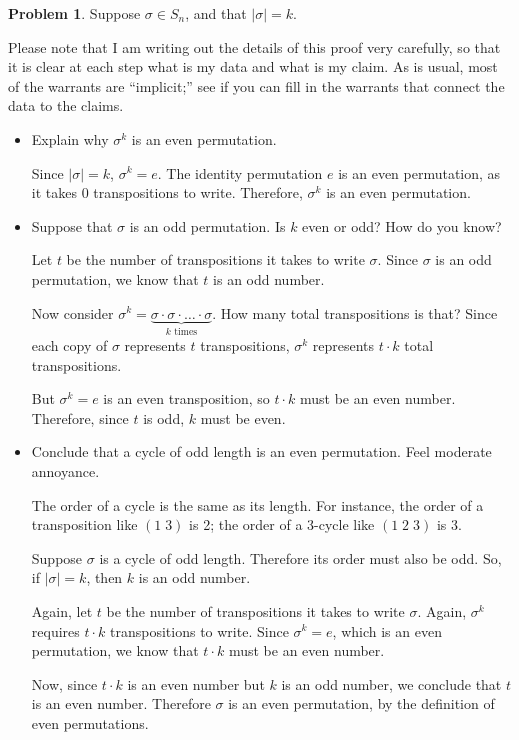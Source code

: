 \documentclass[12pt]{article}
\theoremstyle{definition} %
\newtheorem{problem}{Problem}
\newenvironment{red}{\color{red}}{\ignorespacesafterend}
\begin{document}
\begin{problem}
    Suppose $\sigma \in S_n$, and that $|\sigma| = k$. 

    \begin{red}
        Please note that I am writing out the details of this proof very carefully, so that it is clear at each step what is my data and what is my claim. As is usual, most of the warrants are ``implicit;'' see if you can fill in the warrants that connect the data to the claims.
    \end{red}
    \begin{itemize}
        \item Explain why $\sigma^k$ is an even permutation.

        \begin{red}
            Since $|\sigma| = k$, $\sigma^k = e$. The identity permutation $e$ is an even permutation, as it takes 0 transpositions to write. Therefore, $\sigma^k$ is an even permutation.
        \end{red}
        \item Suppose that $\sigma$ is an odd permutation. Is $k$ even or odd? How do you know?

        \begin{red}
            Let $t$ be the number of transpositions it takes to write $\sigma$. Since $\sigma$ is an odd permutation, we know that $t$ is an odd number.

            Now consider $\sigma^k = \underbrace{\sigma \cdot \sigma \cdot \ldots \cdot \sigma}_{k \text{ times}}$. How many total transpositions is that? Since each copy of $\sigma$ represents $t$ transpositions, $\sigma^k$ represents $t\cdot k$ total transpositions. 

            But $\sigma^k = e$ is an even transposition, so $t\cdot k$ must be an even number. Therefore, since $t$ is odd, $k$ must be even.
        \end{red}
        \item Conclude that a cycle of odd length is an even permutation. Feel moderate annoyance.

        \begin{red}
            The order of a cycle is the same as its length. For instance, the order of a transposition like $(1\;3)$ is 2; the order of a 3-cycle like $(1\;2\;3)$ is 3. 

            Suppose $\sigma$ is a cycle of odd length. Therefore its order must also be odd. So, if $|\sigma| = k$, then $k$ is an odd number.

            Again, let $t$ be the number of transpositions it takes to write $\sigma$. Again, $\sigma^k$ requires $t\cdot k$ transpositions to write. Since $\sigma^k = e$, which is an even permutation, we know that $t\cdot k$ must be an even number.

            Now, since $t\cdot k$ is an even number but $k$ is an odd number, we conclude that $t$ is an even number. Therefore $\sigma$ is an even permutation, by the definition of even permutations.
        \end{red}
    \end{itemize}
\end{problem}
\end{document}
